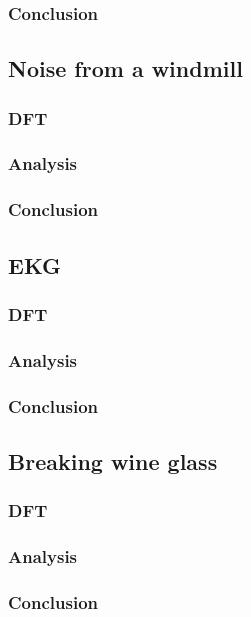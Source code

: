 \subsubsection{Conclusion}

\subsection{Noise from a windmill}
\subsubsection{DFT}

\subsubsection{Analysis}

\subsubsection{Conclusion}

\subsection{EKG}
\subsubsection{DFT}

\subsubsection{Analysis}

\subsubsection{Conclusion}

\subsection{Breaking wine glass}
\subsubsection{DFT}

\subsubsection{Analysis}

\subsubsection{Conclusion}

